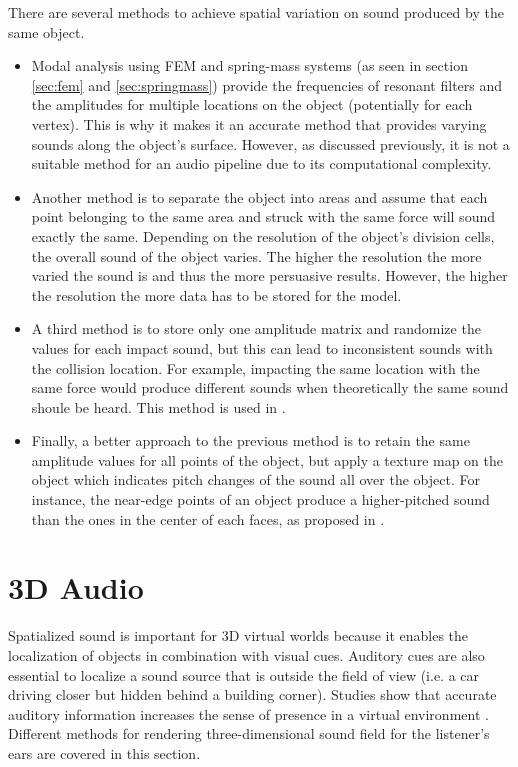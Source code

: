 There are several methods to achieve spatial variation on sound produced by the same object. 
\begin{itemize}
\item Modal analysis using \gls{FEM} and spring-mass systems (as seen in section \ref{sec:fem} and \ref{sec:springmass}) provide the frequencies of resonant filters and the amplitudes for multiple locations on the object (potentially for each vertex). This is why it makes it an accurate method that provides varying sounds along the object's surface. However, as discussed previously, it is not a suitable method for an audio pipeline due to its computational complexity.

\item Another method is to separate the object into areas and assume that each point belonging to the same area and struck with the same force will sound exactly the same. Depending on the resolution of the object's division cells, the overall sound of the object varies. The higher the resolution the more varied the sound is and thus the more persuasive results. However, the higher the resolution the more data has to be stored for the model.

\item A third method is to store only one amplitude matrix and randomize the values for each impact sound, but this can lead to  inconsistent sounds with the collision location. For example, impacting the same location with the same force would produce different sounds when theoretically the same sound shoule be heard. This method is used in \cite{lloyd2011sound}.

\item Finally, a better approach to the previous method is to retain the same amplitude values for all points of the object, but apply a texture map on the object which indicates pitch changes of the sound all over the object. For instance, the near-edge points of an object produce a higher-pitched sound than the ones in the center of each faces, as proposed in \cite{lloyd2011sound}.

\end{itemize}

\section{3D Audio}

Spatialized sound is important for 3D virtual worlds because it enables the localization of objects in combination with visual cues. Auditory cues are also essential to localize a sound source that is outside the field of view (i.e. a car driving closer but hidden behind a building corner). Studies show that accurate auditory information increases the sense of presence in a virtual environment \cite{larsson2002better}. Different methods for rendering three-dimensional sound field for the listener's ears are covered in this section.

